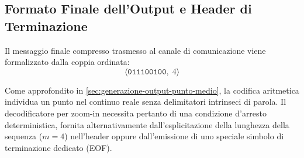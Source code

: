 \begin{table}[H]
\centering
\caption{Traccia computazionale dell'algoritmo \texttt{CONVERTER} per il valore $x = 161/360$ su $9$ bit di precisione.}
\label{tab:traccia-converter-9bit}
\vspace{2mm}
\end{table}

\FloatBarrier
\subsection{Formato Finale dell'Output e Header di Terminazione}
\label{subsec:header-terminazione-aritmetica}

Il messaggio finale compresso trasmesso al canale di comunicazione viene formalizzato dalla coppia ordinata:
\begin{equation}
  \langle \texttt{011100100}, \; 4 \rangle
\end{equation}

\begin{remark}
Come approfondito in \autoref{sec:generazione-output-punto-medio}, la codifica aritmetica individua un punto nel continuo reale senza delimitatori intrinseci di parola. Il decodificatore per zoom-in necessita pertanto di una condizione d'arresto deterministica, fornita alternativamente dall'esplicitazione della lunghezza della sequenza ($m = 4$) nell'header oppure dall'emissione di uno speciale simbolo di terminazione dedicato (EOF).
\end{remark}

